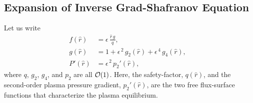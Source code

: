 \documentclass[12pt,prb,aps,notitlepage]{revtex4-1}
\begin{document}
\subsection{Expansion of Inverse Grad-Shafranov Equation}\label{exp}
Let us write
\begin{align}\label{e26v}
f(\hat{r})&= \epsilon\,\frac{\hat{r}\,g}{q},\\[0.5ex]
g(\hat{r}) &= 1+ \epsilon^{\,2}\,g_2(\hat{r}) + \epsilon^{\,4}\,g_4(\hat{r}),\label{e27v}\\[0.5ex]
P'(\hat{r}) &= \epsilon^{\,2}\,p_2'(\hat{r}),\label{eq1}
\end{align}
where $q$,  $g_2$, $g_4$, and $p_2$ are all ${\cal O}(1)$. Here, the safety-factor, $q(\hat{r})$, and the second-order plasma
pressure gradient, $p_2'(\hat{r})$, are the two free flux-surface functions that characterize the plasma equilibrium.
\end{document}
